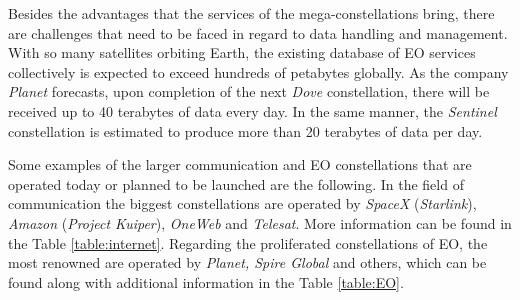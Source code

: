 Besides the advantages that the services of the mega-constellations bring, there are challenges that need to be faced in regard to data handling and management. With so many satellites orbiting Earth, the existing database of EO services collectively is expected to exceed hundreds of petabytes globally. As the company \textit{Planet} forecasts, upon completion of the next \textit{Dove} constellation, there will be received up to 40 terabytes of data every day. In the same manner, the \textit{Sentinel} constellation is estimated to produce more than 20 terabytes of data per day. \cite{LE_Esteve}

Some examples of the larger communication and EO constellations that are operated today or planned to be launched are the following. In the field of communication the biggest constellations are operated by \textit{SpaceX} (\textit{Starlink}), \textit{Amazon} (\textit{Project Kuiper}), \textit{OneWeb} and \textit{Telesat}. More information can be found in the Table \ref{table:internet}. Regarding the proliferated constellations of EO, the most renowned are operated by \textit{Planet, Spire Global} and others, which can be found along with additional information in the Table \ref{table:EO}.

\cite{Hallex}

